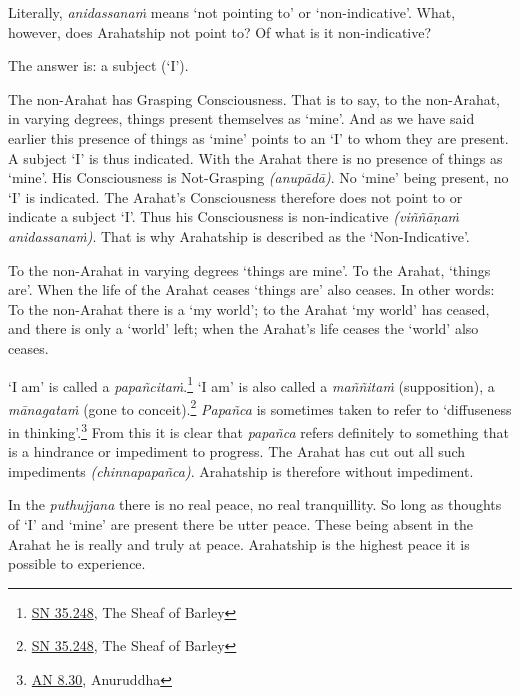 Literally, \emph{anidassanaṁ} means `not pointing to' or `non-indicative'. What, however, does Arahatship not point to? Of what is it non-indicative?

The answer is: a subject (`I').

The non-Arahat has Grasping Consciousness. That is to say, to the non-Arahat, in varying degrees, things present themselves as `mine'. And as we have said earlier this presence of things as `mine' points to an `I' to whom they are present. A subject `I' is thus indicated. With the Arahat there is no presence of things as `mine'. His Consciousness is Not-Grasping \emph{(anupādā)}. No `mine' being present, no `I' is indicated. The Arahat's Consciousness therefore does not point to or indicate a subject `I'. Thus his Consciousness is non-indicative \emph{(viññāṇaṁ anidassanaṁ)}. That is why Arahatship is described as the `Non-Indicative'.

To the non-Arahat in varying degrees `things are mine'. To the Arahat, `things are'. When the life of the Arahat ceases `things are' also ceases. In other words: To the non-Arahat there is a `my world'; to the Arahat `my world' has ceased, and there is only a `world' left; when the Arahat's life ceases the `world' also ceases.


`I am' is called a \emph{papañcitaṁ}.\footnote{\href{https://suttacentral.net/sn35.248/en/bodhi}{SN 35.248}, The Sheaf of Barley} `I am' is also called a \emph{maññitaṁ} (supposition), a \emph{mānagataṁ} (gone to conceit).\footnote{\href{https://suttacentral.net/sn35.248/en/bodhi}{SN 35.248}, The Sheaf of Barley} \emph{Papañca} is sometimes taken to refer to `diffuseness in thinking'.\footnote{\href{https://suttacentral.net/an8.30/en/bodhi}{AN 8.30}, Anuruddha} From this it is clear that \emph{papañca} refers definitely to something that is a hindrance or impediment to progress. The Arahat has cut out all such impediments \emph{(chinnapapañca)}. Arahatship is therefore without impediment.


In the \emph{puthujjana} there is no real peace, no real tranquillity. So long as thoughts of `I' and `mine' are present there  be utter peace. These being absent in the Arahat he is really and truly at peace. Arahatship is the highest peace it is possible to experience.


